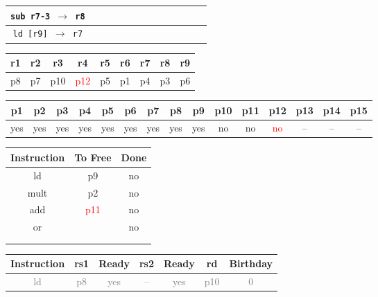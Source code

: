 \documentclass[12pt]{article}
\begin{document}
\begin{enumerate}
\begin{table}[H]
\begin{tabular}{|c|c|c|c|c|c|c|c|c|c|c|c|c|}
					\hline
					\texttt{sub r7-3 $\rightarrow$ r8} &  &  &  &  &  &  &  &  &  &  &  &\\
					\hline
					\texttt{ld [r9] $\rightarrow$ r7} &  &  &  &  &  &  &  &  &  &  &  &\\
					\hline 
				\end{tabular}
			\end{table}
			\begin{table}[H]
				\begin{tabular}{|c|c|c|c|c|c|c|c|c|}
					\hline
					r1 & r2 & r3 & r4 & r5 & r6 & r7 & r8 & r9\\
					\hline
					p8 & p7 & p10 & \textcolor{red}{p12} & p5 & p1 & p4 & p3 & p6\\
					\hline
				\end{tabular}
			\end{table}
			\begin{table}[H]
				\begin{tabular}{|c|c|c|c|c|c|c|c|c|c|c|c|c|c|c|}
					\hline
					p1 & p2 & p3 & p4 & p5 & p6 & p7 & p8 & p9 & p10 & p11 & p12 & p13 & p14 & p15\\
					\hline
					yes & yes & yes & yes & yes & yes & yes & yes & yes & no & no & \textcolor{red}{no} & -- & -- & --\\
					\hline
				\end{tabular}
			\end{table}
			\begin{table}[H]
				\begin{tabular}{|c|c|c|}
					\hline
					Instruction & To Free & Done\\
					\hline
					ld & p9 & no\\
					\hline
					mult & p2 & no\\
					\hline
					add & \textcolor{red}{p11} & no\\
					\hline
					or & & no\\
					\hline
					 & & \\
					\hline
					 & & \\
					\hline
				\end{tabular}
				\hfill
				\begin{tabular}{|c|c|c|c|c|c|c|}
					\hline
					Instruction & rs1 & Ready & rs2 & Ready & rd & Birthday\\
					\hline
					\textcolor{gray}{ld} & \textcolor{gray}{p8} & \textcolor{gray}{yes} & \textcolor{gray}{--} & \textcolor{gray}{yes} & \textcolor{gray}{p10} & \textcolor{gray}{0}\\
					\hline

\end{tabular}
\end{table}
\end{enumerate}
\end{document}
